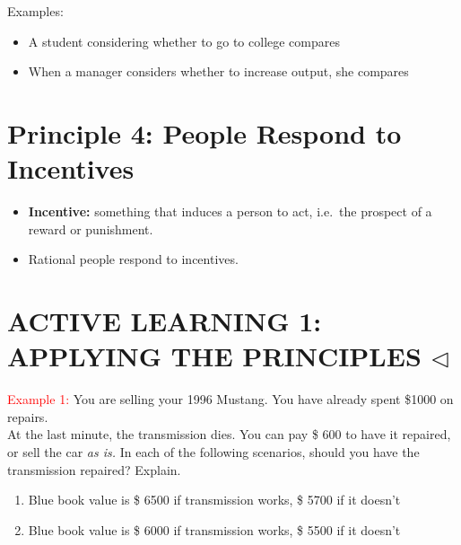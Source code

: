 \documentclass[
]{book}
\providecommand{\tightlist}{%
  \setlength{\itemsep}{0pt}\setlength{\parskip}{0pt}}
\begin{document}
Examples:

\begin{itemize}
\item
  A student considering whether to go to college compares
\item
  When a manager considers whether to increase output, she compares
\end{itemize}

\hypertarget{principle-4-people-respond-to-incentives}{%
\section{Principle 4: People Respond to Incentives}\label{principle-4-people-respond-to-incentives}}

\begin{itemize}
\tightlist
\item
  \textbf{\color{red} Incentive:} something that induces a person to act, i.e.~the prospect of a reward or punishment.
\end{itemize}

\bigskip

\begin{itemize}
\tightlist
\item
  Rational people respond to incentives.
\end{itemize}

\hypertarget{active-learning-1-applying-the-principles-triangleleft}{%
\section{\texorpdfstring{ACTIVE LEARNING 1: APPLYING THE PRINCIPLES \(\triangleleft\)}{ACTIVE LEARNING 1: APPLYING THE PRINCIPLES \textbackslash triangleleft}}\label{active-learning-1-applying-the-principles-triangleleft}}

\textcolor{red}{Example 1:} You are selling your 1996 Mustang. You have already spent \$1000 on repairs.\\
At the last minute, the transmission dies. You can pay \$ 600 to have it repaired, or sell the car \emph{as is.}
In each of the following scenarios, should you have the transmission repaired? Explain.

\begin{enumerate}
\def\labelenumi{\alph{enumi}.}
\item
  Blue book value is \$ 6500 if transmission works, \$ 5700 if it doesn't
\item
  Blue book value is \$ 6000 if transmission works, \$ 5500 if it doesn't
\end{enumerate}
\end{document}
